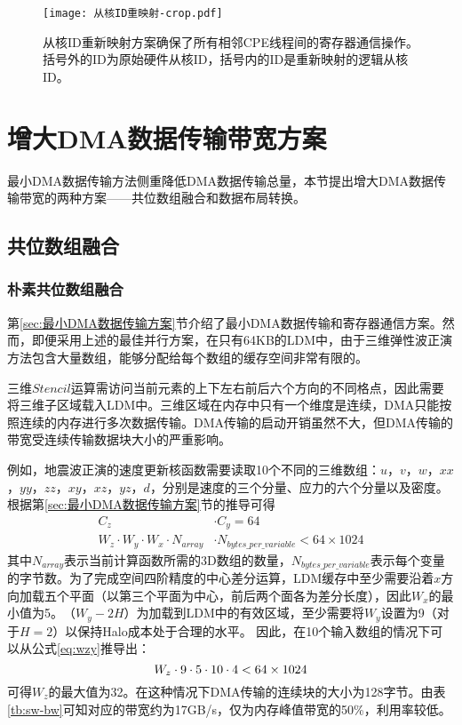 \begin{figure}[ht]
\centering
\texttt{[image: 从核ID重映射-crop.pdf]}
\caption{
从核ID重新映射方案确保了所有相邻CPE线程间的寄存器通信操作。括号外的ID为原始硬件从核ID，括号内的ID是重新映射的逻辑从核ID。}
\label{fig:id-remapping}
\end{figure}

\section{增大DMA数据传输带宽方案} %

最小DMA数据传输方法侧重降低DMA数据传输总量，本节提出增大DMA数据传输带宽的两种方案——共位数组融合和数据布局转换。

\subsection{共位数组融合}
\subsubsection{朴素共位数组融合}

第\ref{sec:最小DMA数据传输方案}节介绍了最小DMA数据传输和寄存器通信方案。然而，即便采用上述的最佳并行方案，在只有64KB的LDM中，由于三维弹性波正演方法包含大量数组，能够分配给每个数组的缓存空间非常有限的。

三维$Stencil$运算需访问当前元素的上下左右前后六个方向的不同格点，因此需要将三维子区域载入LDM中。三维区域在内存中只有一个维度是连续，DMA只能按照连续的内存进行多次数据传输。DMA传输的启动开销虽然不大，但DMA传输的带宽受连续传输数据块大小的严重影响。

例如，地震波正演的速度更新核函数需要读取10个不同的三维数组：$ u $，$ v $，$ w $，$ xx $，$ yy $，$ zz $，$ xy $，$ xz $，$ yz $，$ d $，分别是速度的三个分量、应力的六个分量以及密度。根据第\ref{sec:最小DMA数据传输方案}节的推导可得
\begin{equation}
\begin{aligned}
C_z &\cdot C_y = 64  \\
W_z \cdot W_y \cdot W_x \cdot N_{array} &\cdot N_{bytes\_per\_variable} < 64 \times 1024
\end{aligned}
\label{eq:wzy}
\end{equation}
其中$ N_{array} $表示当前计算函数所需的3D数组的数量，$N_{bytes\_per\_variable}$表示每个变量的字节数。为了完成空间四阶精度的中心差分运算，LDM缓存中至少需要沿着$x$方向加载五个平面（以第三个平面为中心，前后两个面各为差分长度），因此$ W_x $的最小值为5。$（W_y-2H）$为加载到LDM中的有效区域，至少需要将$ W_y $设置为9（对于$ H = 2 $）以保持Halo成本处于合理的水平。
因此，在10个输入数组的情况下可以从公式\ref{eq:wzy}推导出：
\begin{equation}
W_z \cdot 9 \cdot 5 \cdot 10 \cdot 4 < 64 \times 1024\\
\label{eq:wzy1}
\end{equation}
可得$ W_z $的最大值为32。在这种情况下DMA传输的连续块的大小为128字节。由表\ref{tb:sw-bw}可知对应的带宽约为17GB/s，仅为内存峰值带宽的50\%，利用率较低。

